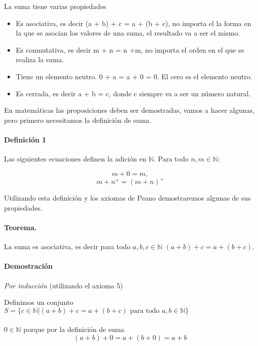 \documentclass{article}
\begin{document}
La suma tiene varias propiedades

\begin{itemize}
    \item Es asociativa, es decir (a + b) + c = a + (b + c), no importa el la forma en la que se asocian los valores de una suma, el resultado va a ser el mismo.
    \item Es conmutativa, es decir m + n = n +m, no importa el orden en el que se realiza la suma.
    \item Tiene un elemento neutro.  0 + a = a + 0 = 0. El cero es el elemento neutro.
    \item Es cerrada, es decir a + b = c, donde c siempre va a ser un número natural.
\end{itemize}

En matemáticas las proposiciones deben ser demostradas, vamos a hacer algunas, pero primero necesitamos la definición de suma.

\paragraph{Definición 1}\cite{tnumprincip_2004}\label{def:sum} Las siguientes ecuaciones definen la adición en $\mathbb{N}$. Para todo $n,m \in \mathbb{N}$:

$$m + 0 = m,$$
$$m + n^+ = (m + n)^+$$

Utilizando esta definición y los axiomas de Peano demostraremos algunas de sus propiedades.

\paragraph{Teorema.} La suma es asociativa, es decir para todo $a,b,c \in \mathbb{N}$ $(a + b) + c = a + (b + c)$.

\paragraph{Demostración} \textit{Por inducción} (utilizando el axioma 5)

Definimos un conjunto $S = \{c \in \mathbb{N} | (a + b) + c = a + (b + c) \text{ para todo } a,b \in \mathbb{N}\}$

\paragraph{} $0 \in \mathbb{N}$ porque por la definición de suma
$$ (a + b) + 0 = a + (b + 0) = a + b$$
\end{document}
